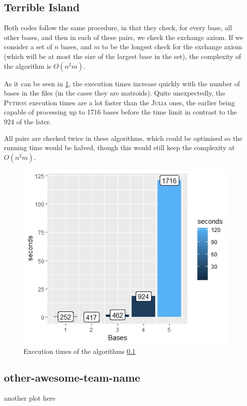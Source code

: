 \documentclass[11pt]{amsart}
\begin{document}
\subsection{Terrible Island}
\label{terribleisland}

Both codes follow the same procedure, in that they check, for every base, all other bases, and then in each of these pairs, we check the exchange axiom. If we consider a set of $n$ bases, and $m$ to be the longest check for the exchange axiom (which will be at most the size of the largest base in the set), the complexity of the algorithm is $O(n^{2}m)$.

As it can be seen in \ref{figureterribleisland}, the execution times increase quickly with the number of bases in the files (in the cases they are matroids). Quite unexpectedly, the \textsc{Python} execution times are a lot faster than the \textsc{Julia} ones, the earlier being capable of processing up to 1716 bases before the time limit in contrast to the 924 of the later.

All pairs are checked twice in these algorithms, which could be optimised so the running time would be halved, though this would still keep the complexity at $O(n^{2}m)$.

\begin{figure}[h!]
    \centering
    \includegraphics[width=.7\textwidth]{./Terrible-Island/times.jpeg}
    \caption{Execution times of the algorithms \ref{terribleisland}}
    \label{figureterribleisland}
\end{figure}

\subsection{other-awesome-team-name}

another plot here
\end{document}
